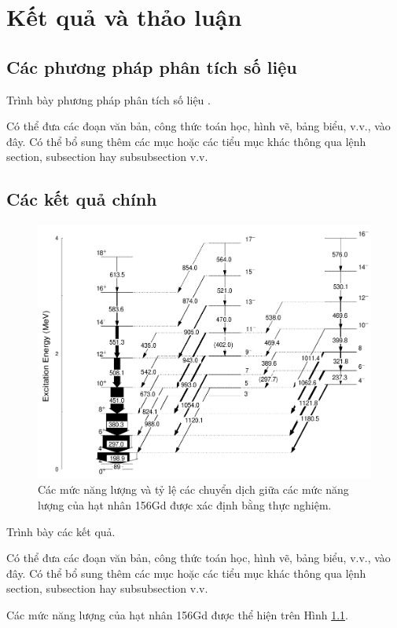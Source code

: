\chapter{Kết quả và thảo luận}
\label{ch:ketqua}

\minitoc

 

\section{Các phương pháp phân tích số liệu}

Trình bày phương pháp phân tích số liệu \cite{bib_Bazzaco, bib_Simpson}. 

Có thể đưa các đoạn văn bản, công thức toán học, hình vẽ, bảng biểu, v.v., vào đây. Có thể bổ sung thêm các mục hoặc các tiểu mục khác thông qua lệnh section, subsection hay subsubsection v.v.

\section{Các kết quả chính}

\begin{figure}[!h]
\centering
\includegraphics[width=0.4\paperwidth]{figure/fig_ketquaphantich/156Gd.png}
\caption{Các mức năng lượng và tỷ lệ các chuyển dịch giữa các mức năng lượng của hạt nhân 156Gd được xác định bằng thực nghiệm.}
\label{fig:156Gd}
\end{figure}


Trình bày các kết quả. 

Có thể đưa các đoạn văn bản, công thức toán học, hình vẽ, bảng biểu, v.v., vào đây. Có thể bổ sung thêm các mục hoặc các tiểu mục khác thông qua lệnh section, subsection hay subsubsection v.v.

Các mức năng lượng của hạt nhân 156Gd được thể hiện trên Hình \ref{fig:156Gd}.

\renewcommand\bibname{Tài liệu tham khảo chương \thechapter}

